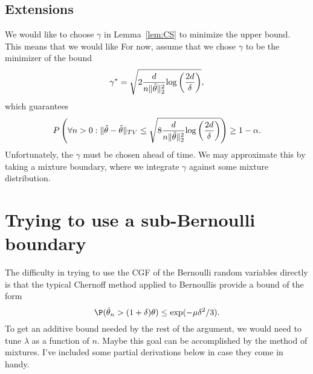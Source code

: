 \documentclass[11pt]{article}
\def\log{{\rm log}}
\begin{document}
\subsection{Extensions}
We would like to choose $\gamma$ in Lemma~\ref{lem:CS} to minimize the upper bound. This means that we would like
For now, assume that we chose $\gamma$ to be the minimizer of the bound
\[
  \gamma^* = \sqrt{ 2\frac{d}{n \Vert \tilde\theta\Vert_2^2}\log\left(\frac{2d}{\delta}\right)},
\]
which guarantees
\begin{align*}
P  \left( \forall n > 0: \Vert\hat\theta - \tilde\theta\Vert_{TV}
  \leq
  \sqrt{ 8\frac{d}{n \Vert \tilde\theta\Vert_2^2}\log\left(\frac{2d}{\delta}\right)}
  \right) \geq 1-\alpha.
\end{align*}
Unfortunately, the $\gamma$ must be chosen ahead of time. We may approximate this by taking a mixture boundary, where we integrate $\gamma$ against some mixture distribution. 





\appendix

\section{Trying to use a sub-Bernoulli boundary}
The difficulty in trying to use the CGF of the Bernoulli random variables directly is that the typical Chernoff method applied to Bernoullis provide a bound of the form
\[
  \P(\hat\theta_n > (1+\delta)\theta)\leq \exp(-\mu\delta^2/3).
\]
To get an additive bound needed by the rest of the argument, we would need to tune $\lambda$ as a function of $n$. Maybe this goal can be accomplished by the method of mixtures. I've included some partial derivations below in case they come in handy.
\end{document}
